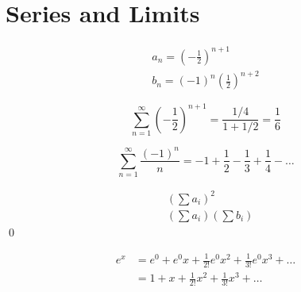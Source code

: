 \documentclass[12pt]{article}
\begin{document}



\pagebreak
\section*{Series and Limits}




\begin{equation}
    \begin{split}
        a_{n} = \left( -\frac{1}{2} \right)^{n + 1} \\
        b_{n} = (-1)^{n} \left( \frac{1}{2} \right)^{n + 2}
    \end{split}
\end{equation}

\begin{equation}
    \sum_{n = 1}^{\infty} \left( -\frac{1}{2} \right)^{n + 1} = \frac{1/4}{1 + 1/2} = \frac{1}{6}
\end{equation}


\begin{equation}
    \sum_{n = 1}^{\infty} \frac{(-1)^{n}}{n} = -1 + \frac{1}{2} - \frac{1}{3} + \frac{1}{4} - \dots
\end{equation}


\begin{equation}
    \begin{split}
        &\left( \sum a_{i} \right)^{2} \\
        &\left( \sum a_{i} \right) \left( \sum b_{i} \right)
    \end{split}
\end{equation}
\qed





\begin{equation}
    \begin{split}
        e^{x} &= e^{0} + e^{0} x + \frac{1}{2!} e^{0} x^{2} + \frac{1}{3!} e^{0} x^{3} + \dots \\
        &= 1 + x + \frac{1}{2!} x^{2} + \frac{1}{3!} x^{3} + \dots
    \end{split}
\end{equation}

\end{document}
